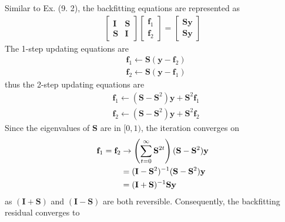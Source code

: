 \begin{exercise}
  Similar to Ex. (9. 2), the backfitting equations are represented as
  \begin{align}
    \left[
      \begin{array}{cc}
        \mathbf{I} & \mathbf{S} \\
        \mathbf{S} & \mathbf{I} 
      \end{array}
    \right]
    \left[
      \begin{array}{c}
        \mathbf{f}_1 \\
        \mathbf{f}_2
      \end{array}
    \right] = \left[
      \begin{array}{c}
        \mathbf{Sy} \\
        \mathbf{Sy}
      \end{array}
    \right]
  \end{align}
  The 1-step updating equations are
  \begin{subequations}
    \begin{align}
      & \mathbf{f}_1 \leftarrow \mathbf{S}(\mathbf{y} - \mathbf{f}_2) \\
      & \mathbf{f}_2 \leftarrow \mathbf{S}(\mathbf{y} - \mathbf{f}_1)
    \end{align}
  \end{subequations}
  thus the 2-step updating equations are
  \begin{subequations}
    \begin{align}
      & \mathbf{f}_1 \leftarrow (\mathbf{S} -\mathbf{S}^2)\mathbf{y} +
      \mathbf{S}^2\mathbf{f}_1 \\
      & \mathbf{f}_2 \leftarrow (\mathbf{S} -\mathbf{S}^2)\mathbf{y} +
      \mathbf{S}^2\mathbf{f}_2
    \end{align}
  \end{subequations}
  Since the eigenvalues of $\mathbf{S}$ are in $[0, 1)$, the iteration converges
  on
  \begin{align}
    \mathbf{f}_1 = \mathbf{f}_2 & \rightarrow
    \left(\sum_{t=0}^{\infty}\mathbf{S}^{2t}\right) (\mathbf{S}
    -\mathbf{S}^2)\mathbf{y} \notag\\
    &= (\mathbf{I} - \mathbf{S}^{2})^{-1} (\mathbf{S}
    -\mathbf{S}^2)\mathbf{y} \notag\\
    &= (\mathbf{I} + \mathbf{S})^{-1} \mathbf{Sy}
  \end{align}
  as $(\mathbf{I} + \mathbf{S})$ and $(\mathbf{I} - \mathbf{S})$ are both
  reversible. Consequently, the backfitting residual converges to

\end{exercise}
